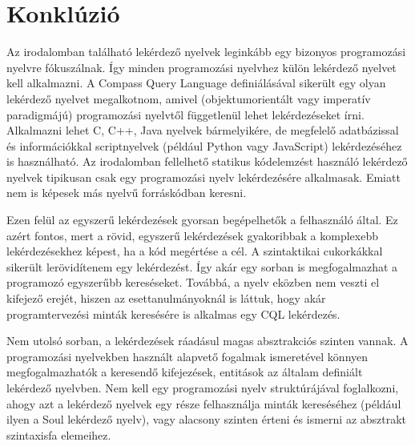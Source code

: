 \documentclass[a4paper,12pt]{report}
\begin{document}
\chapter{Konklúzió}
Az irodalomban található lekérdező nyelvek leginkább egy bizonyos programozási nyelvre fókuszálnak. Így minden programozási nyelvhez külön lekérdező nyelvet kell alkalmazni. A Compass Query Language definiálásával sikerült egy olyan lekérdező nyelvet megalkotnom, amivel (objektumorientált vagy imperatív paradigmájú) programozási nyelvtől függetlenül  lehet lekérdezéseket írni. Alkalmazni lehet C, C++, Java nyelvek bármelyikére, de megfelelő adatbázissal és információkkal scriptnyelvek (például Python vagy JavaScript) lekérdezéséhez is használható. Az irodalomban fellelhető statikus kódelemzést használó lekérdező nyelvek tipikusan csak egy programozási nyelv lekérdezésére alkalmasak. Emiatt nem is képesek más nyelvű forráskódban keresni.
\par Ezen felül az egyszerű lekérdezések gyorsan begépelhetők a felhasználó által. Ez azért fontos, mert a rövid, egyszerű lekérdezések gyakoribbak a komplexebb lekérdezésekhez képest, ha a kód megértése a cél. A szintaktikai cukorkákkal sikerült lerövidítenem egy lekérdezést. Így akár egy sorban is megfogalmazhat a programozó egyszerűbb kereséseket. Továbbá, a nyelv eközben nem veszti el kifejező erejét, hiszen az esettanulmányoknál is láttuk, hogy akár programtervezési minták keresésére is alkalmas egy CQL lekérdezés.
\par Nem utolsó sorban, a lekérdezések ráadásul magas absztrakciós szinten vannak. A programozási nyelvekben használt alapvető fogalmak ismeretével könnyen megfogalmazhatók a keresendő kifejezések, entitások az általam definiált lekérdező nyelvben. Nem kell egy programozási nyelv struktúrájával foglalkozni, ahogy azt a lekérdező nyelvek egy része felhasználja minták kereséséhez (például ilyen a Soul lekérdező nyelv), vagy alacsony szinten érteni és ismerni az absztrakt szintaxisfa elemeihez. 
\end{document}
